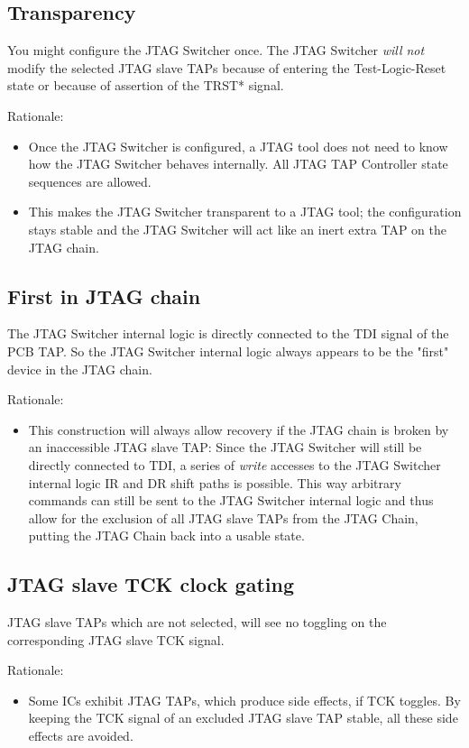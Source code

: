 \documentclass[10pt,english,a4paper]{report}
\begin{document}
\subsection{Transparency}
You might configure the JTAG Switcher once. The JTAG Switcher {\em will not}
modify the selected JTAG slave TAPs because of entering the Test-Logic-Reset state
or because of assertion of the TRST* signal.

Rationale:
\begin{itemize}
\item Once the JTAG Switcher is configured, a JTAG tool does not need to know
how the JTAG Switcher behaves internally. All JTAG TAP Controller state sequences
are allowed.
\item This makes the JTAG Switcher transparent to a JTAG tool; the configuration
stays stable and the JTAG Switcher will act like an inert extra TAP on the JTAG chain.
\end{itemize}

\subsection{First in JTAG chain}
The JTAG Switcher internal logic is directly connected to the TDI signal of
the PCB TAP. So the JTAG Switcher internal logic always appears to be the "first" device
in the JTAG chain.

Rationale:
\begin{itemize}
\item This construction will always allow recovery if the JTAG chain is broken
by an inaccessible JTAG slave TAP: Since the JTAG Switcher will still be directly connected to TDI,
a series of {\em write} accesses to the JTAG Switcher internal logic IR and DR shift paths is possible.
This way arbitrary commands can still be sent to the JTAG Switcher internal logic and thus
allow for the exclusion of all JTAG slave TAPs from the JTAG Chain, putting the JTAG Chain back into
a usable state.
\end{itemize}

\subsection{JTAG slave TCK clock gating}
JTAG slave TAPs which are not selected, will see no toggling on the corresponding JTAG slave TCK signal.

Rationale:
\begin{itemize}
\item Some ICs exhibit JTAG TAPs, which produce side effects, if TCK toggles.
By keeping the TCK signal of an excluded JTAG slave TAP stable, all these side effects are avoided.
\end{itemize}
\end{document}

